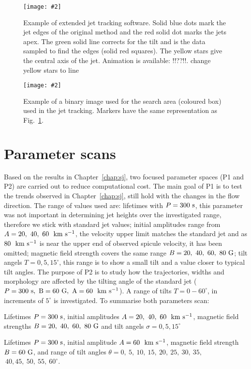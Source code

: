 \documentclass[12pt]{ociamthesis}
\newcommand{\mfig}[4]{
  \begin{figure}
  \begin{center}
  \texttt{[image: \#2]}
  \caption{#3}
  \label{#4}
  \end{center}
  \end{figure}}
\newcommand{\kms}{~\rm{km ~s^{-1}}}
\newcommand\itemp{\item[\textbf{P2:}]}
\begin{document}
\mfig{1}{figures/jet_P300_B60A_60T_0039.png}{Example of extended jet tracking software. Solid blue dots mark the jet edges of the original method and the red solid dot marks the jets apex. The green solid line corrects for the tilt and is the data sampled to find the edges (solid red squares). The yellow stars give the central axis of the jet. Animation is available: !!??!!. {\color{green} change yellow stars to line}}{imporved_j_track_example}
\mfig{1}{figures/example_of_tilt_jet_code.png}{Example of a binary image used for the search area (coloured box) used in the jet tracking. Markers have the same representation as Fig.~\ref{imporved_j_track_example}.}{search_box_j_track_example}
\section{Parameter scans}
\label{sec:pscansII}
Based on the results in Chapter~\ref{chap:sj}, two focused parameter spaces (P1 and P2) are carried out to reduce computational cost. The main goal of P1 is to test the trends observed in Chapter~\ref{chap:sj}, still hold with the changes in the flow direction. The range of values used are: lifetimes with $P=300~\rm{s}$, this parameter was not important in determining jet heights over the investigated range, therefore we stick with standard jet values; initial amplitudes range from $A=20,~40,~60~\kms$, the velocity upper limit matches the standard jet and as $80~\kms$ is near the upper end of observed spicule velocity, it has been omitted; magnetic field strength covers the same range $B=20,~40,~60,~80~\rm{G}$; tilt angels $T=0,5,15^{\circ}$, this range is to show a small tilt and a value closer to typical tilt angles. The purpose of P2 is to study how the trajectories, widths and morphology are affected by the tilting angle of the standard jet ($P=300~\rm{s}, ~B=60~\rm{G}, ~A=60~\kms$). A range of tilts $T=0-60^{\circ}$, in increments of $5^{\circ}$ is investigated. To summarise both parameters scan:
\begin{mylist}
\item  Lifetimes $P=300~\rm{s}$, initial amplitudes $A=20,~40,~60~\kms$, magnetic field strengths $B=20,~40,~60,~80~\rm{G}$ and tilt angels $\sigma=0,5,15^{\circ}$
\itemp Lifetimes $P=300~\rm{s}$, initial amplitude $A=60~\kms$, magnetic field strength $B=60~\rm{G}$, and range of tilt angles $\theta=0, ~5, ~10, ~15, ~20, ~25, ~30, ~35,$ $~40, 45, ~50, ~55, ~60^{\circ}$.
\end{mylist}
%
\end{document}
